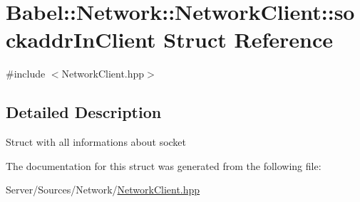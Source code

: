 \hypertarget{structBabel_1_1Network_1_1NetworkClient_1_1sockaddrInClient}{}\section{Babel\+:\+:Network\+:\+:Network\+Client\+:\+:sockaddr\+In\+Client Struct Reference}
\label{structBabel_1_1Network_1_1NetworkClient_1_1sockaddrInClient}


{\ttfamily \#include $<$Network\+Client.\+hpp$>$}



\subsection{Detailed Description}
Struct with all informations about socket 

The documentation for this struct was generated from the following file\+:\begin{DoxyCompactItemize}
\item 
Server/\+Sources/\+Network/\hyperlink{Server_2Sources_2Network_2NetworkClient_8hpp}{Network\+Client.\+hpp}\end{DoxyCompactItemize}
